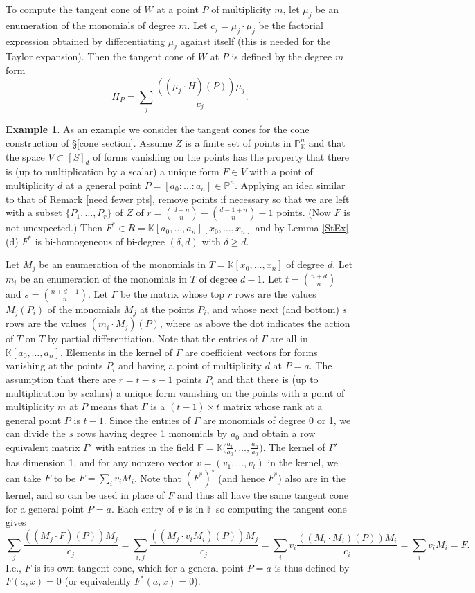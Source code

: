 \documentclass[12pt]{amsart}
\numberwithin{equation}{section}
\theoremstyle{definition}
\newtheorem{example}[theorem]{Example}
\newcommand{\FF}{ \ensuremath{\mathbb{F}}}
\newcommand{\PP}{ \ensuremath{\mathbb{P}}}
\newcommand{\KK}{ \ensuremath{\mathbb{K}}}
\begin{document}
To compute the tangent cone of $W$ at a point $P$ of multiplicity $m$,
let $\mu_j$ be an enumeration of the monomials of degree $m$. Let $c_j=\mu_j\cdot\mu_j$
be the factorial expression obtained by differentiating $\mu_j$ against itself (this is needed for the Taylor expansion).
Then the tangent cone of $W$ at $P$ is defined by the degree $m$ form
\begin{equation} \label{def of HP}
H_P=\sum_j \frac{((\mu_j\cdot H)(P))\mu_j}{c_j}.
\end{equation}


\begin{example}
As an example we consider the tangent cones for the cone construction of \S\ref{cone section}. 
Assume $Z$ is a finite set of points in $\PP^n_\KK$ and that the space $V\subset [S]_d$ of forms vanishing on the points
has the property that there is (up to multiplication by a scalar)
a unique form $F\in V$ with a point of multiplicity $d$ at a general point $P=[a_0:\ldots:a_n]\in\PP^n$. 
Applying an idea similar to that of Remark \ref{need fewer pts}, remove points if necessary so that we are 
left with a subset $\{P_1,\ldots,P_r\}$ of $Z$ of $r=\binom{d+n}{n} - \binom{d-1+n}{n} -1$ points. (Now $F$ is not unexpected.) 
Then $F^*\in R=\KK[a_0,\ldots,a_n][x_0,\ldots,x_n]$ and by Lemma \ref{StEx}(d) $F^*$ is bi-homogeneous
of bi-degree $(\delta,d)$ with $\delta\geq d$.

Let $M_j$ be an enumeration of the monomials in $T=\KK[x_0,\ldots,x_n]$ of degree $d$. Let $m_i$ be an enumeration
of the monomials in $T$ of degree $d-1$. Let $t=\binom{n+d}{n}$ and $s=\binom{n+d-1}{n}$.
Let $\Gamma$ be the matrix whose top $r$ rows are the values $M_j(P_i)$ of the monomials $M_j$ at the points $P_i$,
and whose next (and bottom) $s$ rows are the values $(m_i\cdot M_j)(P)$, 
where as above the dot indicates the action of $T$ on $T$ by partial differentiation.
Note that the entries of $\Gamma$ are all in $\KK[a_0,\ldots,a_n]$.
Elements in the kernel of $\Gamma$ are coefficient vectors for forms vanishing at the points $P_i$ and having a point of multiplicity $d$ at $P = a$.
The assumption that there are $r=t-s-1$ points $P_i$ and that there is (up to multiplication by scalars) a unique form vanishing on the points
with a point of multiplicity $m$ at $P$ means 
that $\Gamma$ is a $(t-1)\times t$ matrix whose rank at a general point $P$ is $t-1$. 
Since the entries of $\Gamma$ are monomials of degree 0 or 1, we can divide the $s$ rows
having degree 1 monomials by $a_0$ and obtain a row equivalent matrix $\Gamma'$
with entries in the field $\FF=\KK\big(\frac{a_1}{a_0},\ldots,\frac{a_n}{a_0}\big)$. The kernel of $\Gamma'$ has dimension 1, and
for any nonzero vector $v=(v_1,\ldots,v_t)$
in the kernel, we can take $F$ to be $F=\sum_iv_iM_i$. 
Note that $(F^*)^\circ$ (and hence $F^*$) also are in the kernel, and so can be used in place of $F$
and thus all have the same tangent cone for a general point $P=a$. 
Each entry of $v$ is in $\FF$ so computing the tangent cone gives
$$\sum_j \frac{((M_j\cdot F)(P))M_j}{c_j}=\sum_{i,j} \frac{((M_j\cdot v_iM_i)(P))M_j}{c_j}
=\sum_i v_i\frac{((M_i\cdot M_i)(P))M_i}{c_i}=\sum_i v_iM_i=F.$$
I.e., $F$ is its own tangent cone, which for a general point $P=a$ is thus defined by $F(a,x)=0$
(or equivalently $F^*(a,x)=0$).


\end{example}
\end{document}
